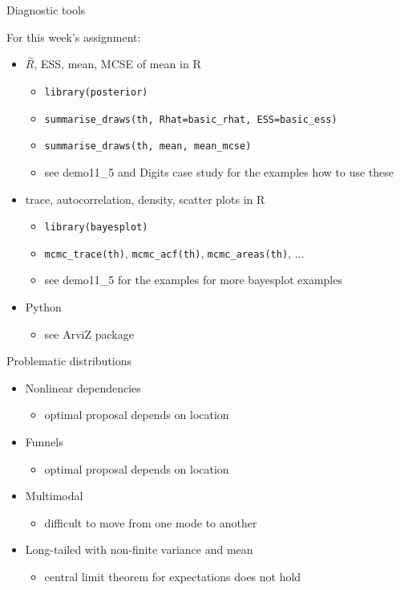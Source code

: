 \documentclass[finnish,english,t]{beamer}
\begin{document}
\begin{frame}{Diagnostic tools}

  For this week's assignment:
  \begin{itemize}
  \item<+-> $\widehat{R}$, ESS, mean, MCSE of mean in R
    \begin{itemize}
    \item \texttt{library(posterior)}
    \item \texttt{summarise\_draws(th, Rhat=basic\_rhat, ESS=basic\_ess)}
    \item \texttt{summarise\_draws(th, mean, mean\_mcse)}
    \item see demo11\_5 and Digits case study for the examples how to use these
    \end{itemize}
  \item<+-> trace, autocorrelation, density, scatter plots in R
    \begin{itemize}
    \item \texttt{library(bayesplot)}
    \item \texttt{mcmc\_trace(th)}, \texttt{mcmc\_acf(th)}, \texttt{mcmc\_areas(th)}, ...
    \item see demo11\_5 for the examples for more bayesplot examples
    \end{itemize}
  \item<+-> Python
    \begin{itemize}
    \item see ArviZ package
    \end{itemize}
  \end{itemize}
  
\end{frame}

\begin{frame}{Problematic distributions}

  \begin{itemize}
  \item<1-> Nonlinear dependencies
    \begin{itemize}
    \item optimal proposal depends on location
    \end{itemize}
  \item<2-> Funnels
    \begin{itemize}
    \item optimal proposal depends on location
    \end{itemize}
  \item<3-> Multimodal
    \begin{itemize}
    \item difficult to move from one mode to another
    \end{itemize}
  \item<4-> Long-tailed with non-finite variance and mean
    \begin{itemize}
    \item central limit theorem for expectations does not hold
    \end{itemize}
  \end{itemize}

\end{frame}
\end{document}
